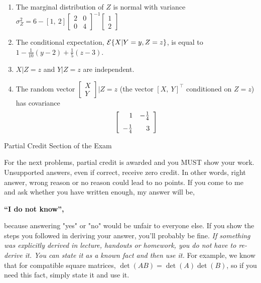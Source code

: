 \documentclass[letterpaper]{article}
\newcommand{\ExpectofGiven}[2]{{\cal E} \{ #1 | #2 \}}
\begin{document}
\begin{enumerate}
\begin{enumerate}
\setlength{\itemsep}{.15in}
\renewcommand{\labelenumi}{(\alph{enumi})}
\setlength{\itemsep}{.1in}
\item The marginal distribution of $Z$ is normal with variance $\sigma_Z^2=6 - [1,~2] \left[  \begin{array}{rr}  2&   0\\  0&   4\end{array}\right]^{-1}\left[\begin{array}{r} 1\\  2\end{array} \right]$
     \item The conditional expectation, $  \ExpectofGiven{X}{Y=y,Z=z} $, is equal to $1-\frac{1}{10}(y-2) + \frac{1}{5}(z-3)$.
\item $X|Z=z$ and $Y|Z=z$  are independent.
\item The random vector $\left[\begin{array}{r} X\\  Y\end{array} \right]|Z=z$ (the vector $[X,~Y]^\top$ conditioned on $Z=z$) has covariance
$$ \left[  \begin{array}{rr}  1&   -\frac{1}{4} \medskip \\  -\frac{1}{4}&  3\end{array}
\right] $$

\end{enumerate}

\end{enumerate}

\newpage

\vspace*{.7in}
\begin{center}
\huge

Partial Credit Section of the Exam

\end{center}



\vspace*{1in}

{\Large  For the next problems, partial credit is awarded and you MUST show your work. Unsupported answers, even if correct, receive zero credit. In other words, right answer, wrong
reason or no reason could lead to no points. If you come to me and ask whether you have written enough, my answer will be,
\begin{center}
\bf ``I do not know'',
\end{center}
 because answering "yes" or "no"  would be unfair to everyone else. If you show the steps you followed in deriving your answer, you'll probably be fine.
  \emph{If something was explicitly derived in lecture, handouts or homework, you do not have to re-derive it. You can state it as a known fact and then use it.} For example, we know that for compatible square matrices, $\det(A B) = \det(A) \det(B)$, so if you need this fact, simply state it and use it.}
\end{document}
